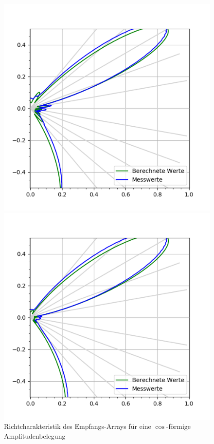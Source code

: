 \begin{figure}[htb]
\begin{minipage}{0.5\textwidth}
\includegraphics[width=\textwidth]{graphics/plot_test_characteristic_receiver_30_deg_send_rect_receive_cos_6_bursts.png}
\caption{Richtcharakteristik des Empfangs-Arrays für eine $\cos$-förmige Amplitudenbelegung} %
\label{fig:plot_test_characteristic_receiver_30_deg_send_rect_receive_cos_6_bursts}
%
\end{minipage}
\begin{minipage}{0.5\textwidth}
\includegraphics[width=\textwidth]{graphics/plot_test_characteristic_receiver_30_deg_send_rect_receive_cos2_6_bursts.png}

\end{minipage}
\end{figure}
